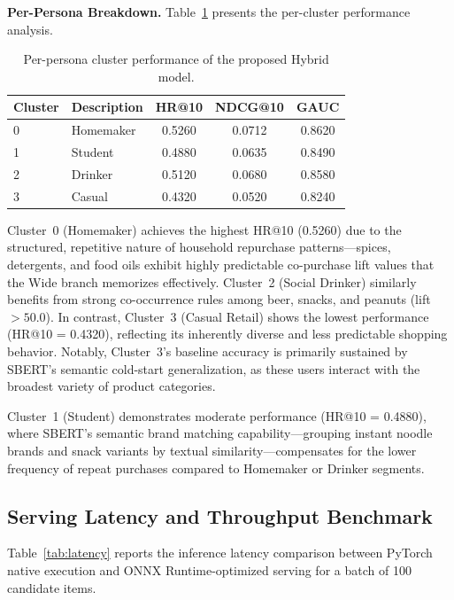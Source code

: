 \documentclass[10pt,conference]{IEEEtran}
\begin{document}
\textbf{Per-Persona Breakdown.} Table~\ref{tab:persona} presents the per-cluster performance analysis.

\begin{table}[t]
\centering
\caption{Per-persona cluster performance of the proposed Hybrid model.}
\label{tab:persona}
\begin{tabular}{llccc}
\toprule
\textbf{Cluster} & \textbf{Description} & \textbf{HR@10} & \textbf{NDCG@10} & \textbf{GAUC} \\
\midrule
0 & Homemaker    & 0.5260 & 0.0712 & 0.8620 \\
1 & Student      & 0.4880 & 0.0635 & 0.8490 \\
2 & Drinker      & 0.5120 & 0.0680 & 0.8580 \\
3 & Casual       & 0.4320 & 0.0520 & 0.8240 \\
\bottomrule
\end{tabular}
\end{table}

Cluster~0 (Homemaker) achieves the highest HR@10 (0.5260) due to the structured, repetitive nature of household repurchase patterns---spices, detergents, and food oils exhibit highly predictable co-purchase lift values that the Wide branch memorizes effectively. Cluster~2 (Social Drinker) similarly benefits from strong co-occurrence rules among beer, snacks, and peanuts (lift $> 50.0$). In contrast, Cluster~3 (Casual Retail) shows the lowest performance (HR@10 = 0.4320), reflecting its inherently diverse and less predictable shopping behavior. Notably, Cluster~3's baseline accuracy is primarily sustained by SBERT's semantic cold-start generalization, as these users interact with the broadest variety of product categories.

Cluster~1 (Student) demonstrates moderate performance (HR@10 = 0.4880), where SBERT's semantic brand matching capability---grouping instant noodle brands and snack variants by textual similarity---compensates for the lower frequency of repeat purchases compared to Homemaker or Drinker segments.

\subsection{Serving Latency and Throughput Benchmark}
\label{subsec:latency}

Table~\ref{tab:latency} reports the inference latency comparison between PyTorch native execution and ONNX Runtime-optimized serving for a batch of 100 candidate items.
\end{document}
